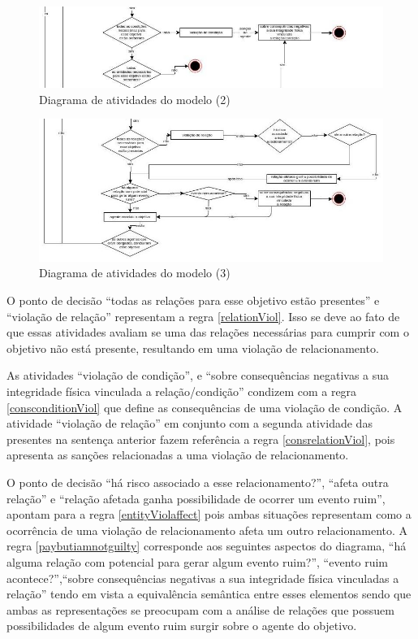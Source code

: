 \begin{figure}[H]
  \centering
  \includegraphics[width=1.1\linewidth]{figure/diag2.jpg} 
  \caption{Diagrama de atividades do modelo (2)}
  \label{atividiagram2}
\end{figure}

\begin{figure}[H]
  \centering
  \includegraphics[width=1.1\linewidth]{figure/diag3.jpg} 
  \caption{Diagrama de atividades do modelo (3)}
  \label{atividiagram3}
\end{figure}


O ponto de decisão ``todas as relações para esse objetivo estão presentes'' e ``violação de relação'' representam a regra \ref{relationViol}. Isso se deve ao fato de que essas atividades avaliam se uma das relações necessárias para cumprir com o objetivo não está presente, resultando em uma violação de relacionamento. 

As atividades ``violação de condição'', e ``sobre consequências negativas a sua integridade física vinculada a relação/condição'' condizem com a regra \ref{consconditionViol} que define as consequências de uma violação de condição. A atividade ``violação de relação'' em conjunto com a segunda atividade das presentes na sentença anterior fazem referência a regra \ref{consrelationViol}, pois apresenta as sanções relacionadas a uma violação de relacionamento. 

O ponto de decisão ``há risco associado a esse relacionamento?'', ``afeta  outra relação'' e ``relação afetada ganha possibilidade de ocorrer um evento ruim'', apontam para a regra \ref{entityViolaffect} pois ambas situações representam como a ocorrência de uma violação de relacionamento afeta um outro relacionamento. A regra \ref{paybutiamnotguilty} corresponde aos seguintes aspectos do diagrama, ``há alguma relação com potencial para gerar algum evento ruim?'', ``evento ruim acontece?'',``sobre consequências negativas a sua integridade física vinculadas a relação'' tendo em vista a equivalência semântica entre esses elementos sendo que ambas as representações se preocupam com a análise de relações que possuem possibilidades de algum evento ruim surgir sobre o agente do objetivo. 

